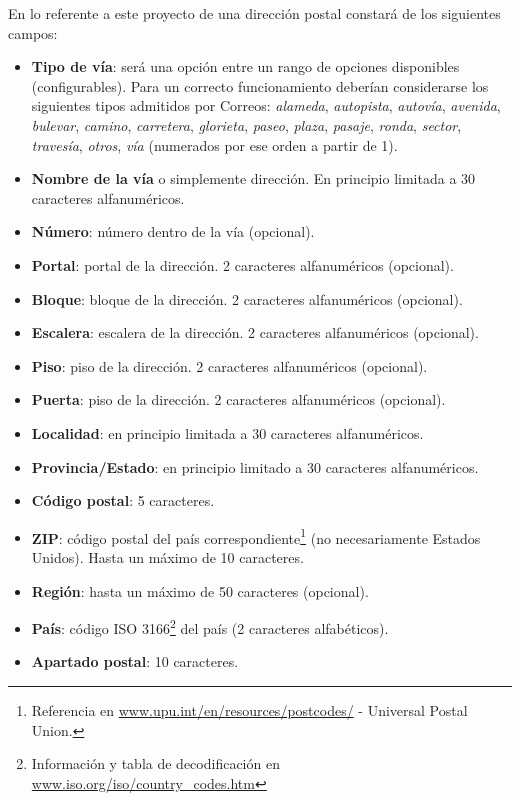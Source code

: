 \documentclass[11pt, a4paper, twoside, titlepage]{article}
\begin{document}
					En lo referente a este proyecto de \software una dirección postal constará de los siguientes campos:
					\begin{itemize}
						\item \textbf{Tipo de vía}: será una opción entre un rango de opciones disponibles (configurables). Para un correcto funcionamiento deberían considerarse los siguientes tipos admitidos por Correos: \textit{alameda}, \textit{autopista}, \textit{autovía}, \textit{avenida}, \textit{bulevar}, \textit{camino}, \textit{carretera}, \textit{glorieta}, \textit{paseo}, \textit{plaza}, \textit{pasaje}, \textit{ronda}, \textit{sector}, \textit{travesía}, \textit{otros}, \textit{vía} (numerados por ese orden a partir de 1).
						\item \textbf{Nombre de la vía} o simplemente dirección. En principio limitada a 30 caracteres alfanuméricos.
						\item \textbf{Número}: número dentro de la vía (opcional).
						\item \textbf{Portal}: portal de la dirección. 2 caracteres alfanuméricos (opcional).
						\item \textbf{Bloque}: bloque de la dirección. 2 caracteres alfanuméricos (opcional).
						\item \textbf{Escalera}: escalera de la dirección. 2 caracteres alfanuméricos (opcional).
						\item \textbf{Piso}: piso de la dirección. 2 caracteres alfanuméricos (opcional).
						\item \textbf{Puerta}: piso de la dirección. 2 caracteres alfanuméricos (opcional).
						\item \textbf{Localidad}: en principio limitada a 30 caracteres alfanuméricos.
						\item \textbf{Provincia/Estado}: en principio limitado a 30 caracteres alfanuméricos.
						\item \textbf{Código postal}: 5 caracteres.
						\item \textbf{ZIP}: código postal del país correspondiente\footnote{Referencia en \url{www.upu.int/en/resources/postcodes/} - Universal Postal Union.} (no necesariamente Estados Unidos). Hasta un máximo de 10 caracteres.
						\item \textbf{Región}: hasta un máximo de 50 caracteres (opcional).
						\item \textbf{País}: código ISO 3166\footnote{Información y tabla de decodificación en \url{www.iso.org/iso/country_codes.htm}} del país (2 caracteres alfabéticos).
						\item \textbf{Apartado postal}: 10 caracteres.
					\end{itemize}
\end{document}
